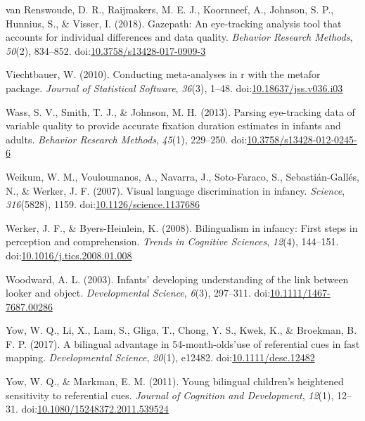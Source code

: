 \documentclass[,man,floatsintext]{apa6}
\begin{document}
\leavevmode\hypertarget{ref-vanRenswoude_etal_2018}{}%
van Renswoude, D. R., Raijmakers, M. E. J., Koornneef, A., Johnson, S. P., Hunnius, S., \& Visser, I. (2018). Gazepath: An eye-tracking analysis tool that accounts for individual differences and data quality. \emph{Behavior Research Methods}, \emph{50}(2), 834--852. doi:\href{https://doi.org/10.3758/s13428-017-0909-3}{10.3758/s13428-017-0909-3}

\leavevmode\hypertarget{ref-Viechtbauer_2010}{}%
Viechtbauer, W. (2010). Conducting meta-analyses in r with the metafor package. \emph{Journal of Statistical Software}, \emph{36}(3), 1--48. doi:\href{https://doi.org/10.18637/jss.v036.i03}{10.18637/jss.v036.i03}

\leavevmode\hypertarget{ref-Wass_etal_2013}{}%
Wass, S. V., Smith, T. J., \& Johnson, M. H. (2013). Parsing eye-tracking data of variable quality to provide accurate fixation duration estimates in infants and adults. \emph{Behavior Research Methods}, \emph{45}(1), 229--250. doi:\href{https://doi.org/10.3758/s13428-012-0245-6}{10.3758/s13428-012-0245-6}

\leavevmode\hypertarget{ref-Weikum_etal_2007}{}%
Weikum, W. M., Vouloumanos, A., Navarra, J., Soto-Faraco, S., Sebastián-Gallés, N., \& Werker, J. F. (2007). Visual language discrimination in infancy. \emph{Science}, \emph{316}(5828), 1159. doi:\href{https://doi.org/10.1126/science.1137686}{10.1126/science.1137686}

\leavevmode\hypertarget{ref-Werker_Byers-Heinlein_2008}{}%
Werker, J. F., \& Byers-Heinlein, K. (2008). Bilingualism in infancy: First steps in perception and comprehension. \emph{Trends in Cognitive Sciences}, \emph{12}(4), 144--151. doi:\href{https://doi.org/10.1016/j.tics.2008.01.008}{10.1016/j.tics.2008.01.008}

\leavevmode\hypertarget{ref-Woodward_2003}{}%
Woodward, A. L. (2003). Infants' developing understanding of the link between looker and object. \emph{Developmental Science}, \emph{6}(3), 297--311. doi:\href{https://doi.org/10.1111/1467-7687.00286}{10.1111/1467-7687.00286}

\leavevmode\hypertarget{ref-Yow_etal_2017}{}%
Yow, W. Q., Li, X., Lam, S., Gliga, T., Chong, Y. S., Kwek, K., \& Broekman, B. F. P. (2017). A bilingual advantage in 54-month-olds'use of referential cues in fast mapping. \emph{Developmental Science}, \emph{20}(1), e12482. doi:\href{https://doi.org/10.1111/desc.12482}{10.1111/desc.12482}

\leavevmode\hypertarget{ref-Yow_Markman_2011}{}%
Yow, W. Q., \& Markman, E. M. (2011). Young bilingual children's heightened sensitivity to referential cues. \emph{Journal of Cognition and Development}, \emph{12}(1), 12--31. doi:\href{https://doi.org/10.1080/15248372.2011.539524}{10.1080/15248372.2011.539524}

\endgroup
\end{document}
